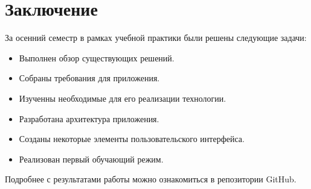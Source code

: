 \chapter{Заключение}
За осенний семестр в рамках учебной практики были решены следующие задачи:\par
\begin{itemize}
  \item Выполнен обзор существующих решений.
  \item Собраны требования для приложения.
  \item Изученны необходимые для его реализации технологии.
  \item Разработана архитектура приложения.
  \item Созданы некоторые элементы пользовательского интерфейса.
  \item Реализован первый обучающий режим.
\end{itemize}
Подробнее с результатами работы можно ознакомиться в репозитории GitHub\cite{project}.